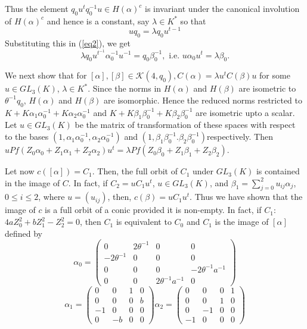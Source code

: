 \begin{Proof}
Thus the element $q_0 u^{t} q^{-1}_0 u\in H(\alpha)^{c}$ is invariant under the canonical involution of $H(\alpha)^{c}$ and hence is a constant, say $\lambda \in K^{\ast}$ so that 
$$
u q_0=\lambda q_0 u^{t-1}
$$
Substituting this in (\ref{eq2}), we get 
$$
\lambda q_0 u^{t^{-1}}\alpha^{-1}_0 u^{-1}=q_0 \beta^{-1}_0, \text{ i.e. } u\alpha_0 u^{t}=\lambda \beta_0.
$$

We next show that for $[\alpha], [\beta] \in \mathscr{K}(4, q_0), C(\alpha)=\lambda u^{t} C(\beta)u$ for some $u\in GL_3(K)$, $\lambda \in K^{\ast}$. Since the norms in $H(\alpha)$ and $H(\beta)$ are isometric to $\theta^{-1}q_0$, $H(\alpha)$ and $H(\beta)$ are isomorphic. Hence the reduced norms restricted to $K+K \alpha_1 \alpha^{-1}_0 + K\alpha_2\alpha_0^{-1}$ and $K+K \beta_1 \beta^{-1}_0+K \beta_2\beta^{-1}_0$ are isometric upto a scalar. Let $u \in GL_3(K)$ be the matrix of transformation of these spaces with respect to the bases $\left(1, \alpha_1 \alpha^{-1}_0, \alpha_2 \alpha^{-1}_0\right)$ and $\left(1,\beta_1 \beta^{-1}_0. \beta_2\beta_0^{-1}\right)$\pageoriginale respectively. Then $u Pf\left(Z_0 \alpha_0+Z_1\alpha_1+Z_2\alpha_2\right)u^{t}=\lambda Pf\left(Z_0\beta_0+Z_1\beta_1+Z_2\beta_2\right)$. 

Let now $c([\alpha])=C_1$. Then, the full orbit of $C_1$ under $GL_3(K)$ is contained in the image of $C$. In fact, if $C_2=u C_1 u^{t}$, $u\in GL_{3}(K)$, and $\beta_1=\sum\limits_{j=0}^{2}u_{ij}\alpha_j$, $0\leq i \leq 2$, where $u=(u_{ij})$, then, $c(\beta)=u C_1 u^{t}$. Thus we have shown that the image of $c$ is a full orbit of a conic provided it is non-empty. In fact, if $C_1$: $4a Z^{2}_0+bZ^{2}_1-Z^{2}_2=0$, then $C_1$ is equivalent to $C_0$ and $C_1$ is the image of $[\alpha]$ defined by 
$$
\alpha_0=
\begin{pmatrix}
0 & 2\theta^{-1} & 0 & 0\\
-2\theta^{-1} & 0 & 0 & 0\\
 0 & 0 & 0 & -2\theta^{-1}a^{-1}\\
0 & 0 & 2\theta^{-1}a^{-1}& 0
\end{pmatrix}
$$
$$
\alpha_1=
\begin{pmatrix}
0 & 0 & 1 & 0\\
0 & 0 & 0 & b\\
-1 &  0 & 0 & 0\\
0 & -b & 0 & 0
\end{pmatrix}\alpha_2=
\begin{pmatrix}
0 & 0 & 0 &1\\
0 & 0 & 1 & 0\\
0 & -1 & 0 & 0\\
-1 & 0 & 0 & 0
\end{pmatrix}
$$
\end{Proof}

